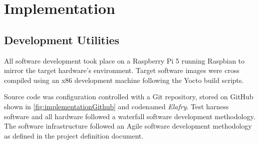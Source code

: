 \graphicspath{{main/implementation/graphics}}

\section{Implementation}





\subsection{Development Utilities}

All software development took place on a Raspberry Pi 5 running Raspbian to mirror the target hardware's environment. Target software images were cross compiled using an x86 development machine following the Yocto build scripts.

Source code was configuration controlled with a Git repository, stored on GitHub shown in \autoref{fig:implementationGithub} and codenamed \textit{Elafry}. Test harness software and all hardware followed a waterfall software development methodology. The software infrastructure followed an Agile software development methodology as defined in the project definition document.

